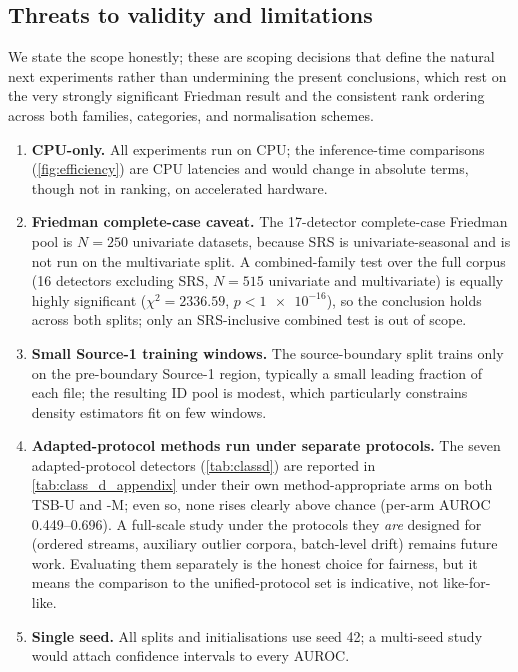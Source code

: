 \subsection{Threats to validity and limitations}\label{sec:disc-limits}
We state the scope honestly; these are scoping decisions that define the natural
next experiments rather than undermining the present conclusions, which rest on the
very strongly significant Friedman result and the consistent rank ordering across
both families, categories, and normalisation schemes.
\begin{enumerate}
  \item \textbf{CPU-only.} All experiments run on CPU; the inference-time comparisons
  (\cref{fig:efficiency}) are CPU latencies and would change in absolute terms,
  though not in ranking, on accelerated hardware.
  \item \textbf{Friedman complete-case caveat.} The \num{17}-detector complete-case
  Friedman pool is $N = \num{250}$ univariate datasets, because SRS is
  univariate-seasonal and is not run on the multivariate split. A combined-family test
  over the full corpus (\num{16} detectors excluding SRS, $N = \num{515}$ univariate
  and multivariate) is equally highly significant ($\chi^2 = \num{2336.59}$,
  $p < \num{1e-16}$), so the conclusion holds across both splits; only an
  SRS-inclusive combined test is out of scope.
  \item \textbf{Small Source-1 training windows.} The source-boundary split trains
  only on the pre-boundary Source-1 region, typically a small leading fraction of
  each file; the resulting ID pool is modest, which particularly constrains density
  estimators fit on few windows.
  \item \textbf{Adapted-protocol methods run under separate protocols.} The seven
  adapted-protocol detectors (\cref{tab:classd}) are reported in
  \cref{tab:class_d_appendix} under their own method-appropriate arms on both TSB-U and
  -M; even so, none rises clearly above chance (per-arm AUROC \numrange{0.449}{0.696}).
  A full-scale study under the protocols they \emph{are} designed for (ordered streams,
  auxiliary outlier corpora, batch-level drift) remains future work. Evaluating them
  separately is the honest choice for fairness, but it means the comparison to the
  unified-protocol set is indicative, not like-for-like.
  \item \textbf{Single seed.} All splits and initialisations use seed \num{42}; a
  multi-seed study would attach confidence intervals to every AUROC.
\end{enumerate}

